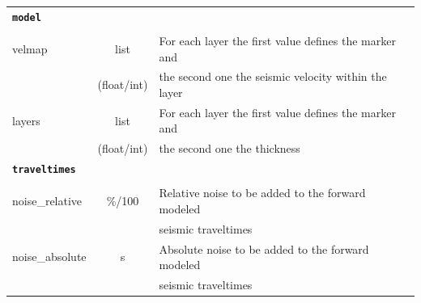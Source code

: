 \documentclass[a4paper,fleqn]{cas-sc}
\begin{document}
\begin{table}[]
\begin{tabular*}{\tblwidth}{@{} LCL@{}}
        \midrule
        \textbf{\texttt{model}} & & \\
         & & \\
        velmap & list & For each layer the first value defines the marker and \\
         & (float/int) & the second one the seismic velocity within the layer \\
        layers & list & For each layer the first value defines the marker and \\
         & (float/int) & the second one the thickness \\
        \midrule
        \textbf{\texttt{traveltimes}} & & \\
         & & \\
        noise\_relative & \%/100 & Relative noise to be added to the forward modeled \\
      	 & & seismic traveltimes \\
        noise\_absolute & s & Absolute noise to be added to the forward modeled \\
         & & seismic traveltimes\\
        \bottomrule
    \end{tabular*}
    \label{tab:config}
\end{table}

\end{document}
